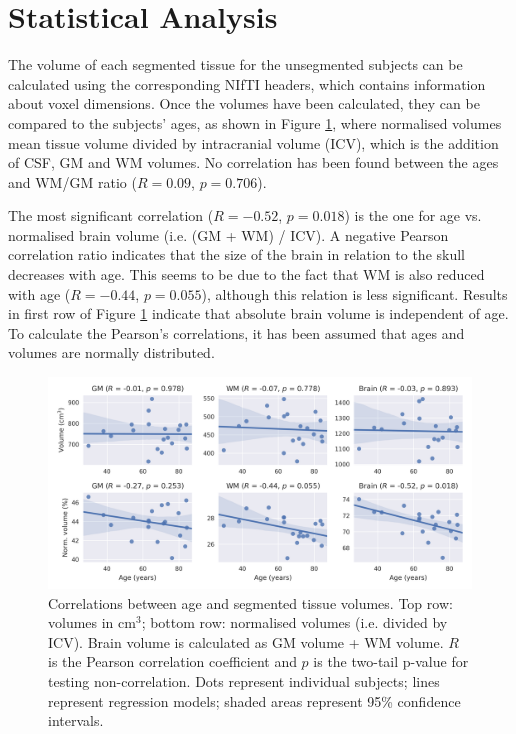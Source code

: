 \section{Statistical Analysis}



The volume of each segmented tissue for the unsegmented subjects can be calculated using the corresponding NIfTI headers, which contains information about voxel dimensions. Once the volumes have been calculated, they can be compared to the subjects' ages, as shown in Figure \ref{fig:volumes-correlations}, where normalised volumes mean tissue volume divided by intracranial volume (ICV), which is the addition of CSF, GM and WM volumes. No correlation has been found between the ages and WM/GM ratio ($R = 0.09$, $p = 0.706$).

The most significant correlation ($R = -0.52$, $p = 0.018$) is the one for age vs. normalised brain volume (i.e. (GM + WM) / ICV). A negative Pearson correlation ratio indicates that the size of the brain in relation to the skull decreases with age. This seems to be due to the fact that WM is also reduced with age ($R = -0.44$, $p = 0.055$), although this relation is less significant. Results in first row of Figure \ref{fig:volumes-correlations} indicate that absolute brain volume is independent of age. To calculate the Pearson's correlations, it has been assumed that ages and volumes are normally distributed.

\begin{figure}
  \centering
  \includegraphics[width=\textwidth]{figures/volumes_stats}
  \caption{Correlations between age and segmented tissue volumes. Top row: volumes in cm$^3$; bottom row: normalised volumes (i.e. divided by ICV). Brain volume is calculated as GM volume + WM volume. $R$ is the Pearson correlation coefficient and $p$ is the two-tail p-value for testing non-correlation. Dots represent individual subjects; lines represent regression models; shaded areas represent 95\% confidence intervals.}
  \label{fig:volumes-correlations}
\end{figure}
